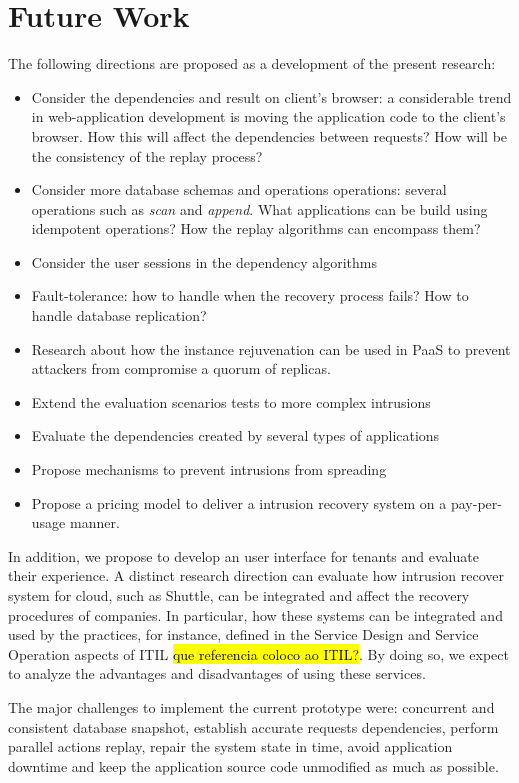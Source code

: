 \section{Future Work}\label{sec:conclusion:future_work}
The following directions are proposed as a development of the present research:
\begin{itemize}
\item Consider the dependencies and result on client's browser: a considerable trend in web-application development is moving the application code to the client's browser. How this will affect the dependencies between requests? How will be the consistency of the replay process?
\item Consider more database schemas and operations operations: several operations such as \emph{scan} and \emph{append}. What applications can be build using idempotent operations? How the replay algorithms can encompass them?
\item Consider the user sessions in the dependency algorithms
\item Fault-tolerance: how to handle when the recovery process fails? How to handle database replication?
\item Research about how the instance rejuvenation can be used in \ac{PaaS} to prevent attackers from compromise a quorum of replicas.
\item Extend the evaluation scenarios tests to more complex intrusions
\item Evaluate the dependencies created by several types of applications
\item Propose mechanisms to prevent intrusions from spreading
\item Propose a pricing model to deliver a intrusion recovery system on a pay-per-usage manner.
\end{itemize}

In addition, we propose to develop an user interface for tenants and evaluate their experience. A distinct research direction can evaluate how intrusion recover system for cloud, such as Shuttle, can be integrated and affect the recovery procedures of companies. In particular, how these systems can be integrated and used by the practices, for instance, defined in the Service Design and Service Operation aspects of ITIL \cite{itil} \hl{que referencia coloco ao ITIL?}. By doing so, we expect to analyze the advantages and disadvantages of using these services.

The major challenges to implement the current prototype were: concurrent and consistent database snapshot, establish accurate requests dependencies, perform parallel actions replay, repair the system state in time, avoid application downtime and keep the application source code unmodified as much as possible.

